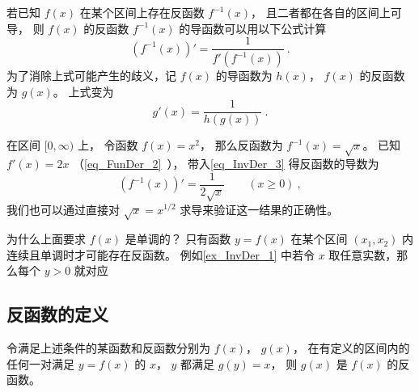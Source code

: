 

若已知 $f(x)$ 在某个区间上存在反函数 $f^{-1}(x)$， 且二者都在各自的区间上可导， 则 $f(x)$ 的反函数 $f^{-1}(x)$ 的导函数可以用以下公式计算
\begin{equation}\label{eq_InvDer_3}
(f^{-1}(x))' = \frac{1}{f'(f^{-1}(x))} ~.
\end{equation} 
为了消除上式可能产生的歧义，记 $f(x)$ 的导函数为 $h(x)$，  $f(x)$ 的反函数为 $g(x)$。 上式变为
 \begin{equation}
g'(x) = \frac{1}{h(g(x))}~.
\end{equation}

\begin{example}{}\label{ex_InvDer_1}
在区间 $[0, \infty)$ 上， 令函数 $f(x) = x^2$， 那么反函数为 $f^{-1}(x) = \sqrt{x}$。 已知 $f'(x) = 2x$ （\autoref{eq_FunDer_2}~）， 带入\autoref{eq_InvDer_3} 得反函数的导数为
\begin{equation}
(f^{-1}(x))' = \frac{1}{2\sqrt{x}} \qquad (x \ge 0)~,
\end{equation}
我们也可以通过直接对 $\sqrt{x} = x^{1/2}$ 求导来验证这一结果的正确性。
\end{example}

为什么上面要求 $f(x)$ 是单调的？ 只有函数 $y = f(x)$ 在某个区间 $(x_1, x_2)$ 内连续且单调时才可能存在反函数。 例如\autoref{ex_InvDer_1} 中若令 $x$ 取任意实数，那么每个 $y > 0$  就对应

\subsection{反函数的定义}
令满足上述条件的某函数和反函数分别为 $f(x)$，  $g(x)$， 在有定义的区间内的任何一对满足 $y = f(x)$ 的 $x$，  $y$ 都满足 $g(y) = x$， 则 $g(x)$ 是 $f(x)$ 的反函数。

